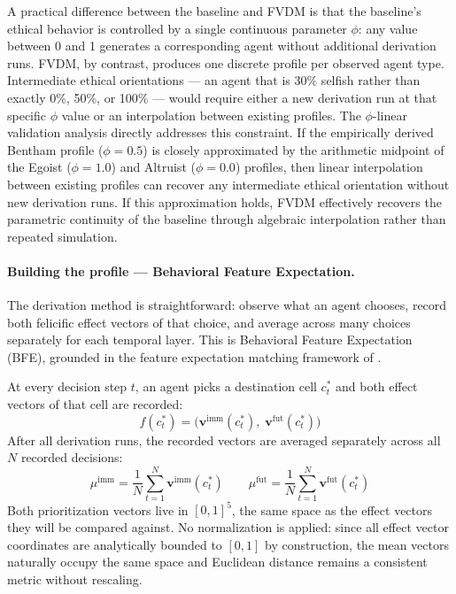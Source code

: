 \documentclass{icsthesis}
\begin{document}
\begin{mainmatter}
A practical difference between the baseline and FVDM is that the baseline’s ethical behavior is controlled by a single continuous parameter $\phi$: any value between 0 and 1 generates a corresponding agent without additional derivation runs. FVDM, by contrast, produces one discrete profile per observed agent type. Intermediate ethical orientations --- an agent that is 30\% selfish rather than exactly 0\%, 50\%, or 100\% --- would require either a new derivation run at that specific $\phi$ value or an interpolation between existing profiles. The $\phi$-linear validation analysis directly addresses this constraint. If the empirically derived Bentham profile ($\phi = 0.5$) is closely approximated by the arithmetic midpoint of the Egoist ($\phi = 1.0$) and Altruist ($\phi = 0.0$) profiles, then linear interpolation between existing profiles can recover any intermediate ethical orientation without new derivation runs. If this approximation holds, FVDM effectively recovers the parametric continuity of the baseline through algebraic interpolation rather than repeated simulation.

\paragraph{Building the profile --- Behavioral Feature Expectation.}
The derivation method is straightforward: observe what an agent chooses, record both felicific effect vectors of that choice, and average across many choices separately for each temporal layer. This is Behavioral Feature Expectation (BFE), grounded in the feature expectation matching framework of \citet{AbbeelNg2004}.

At every decision step $t$, an agent picks a destination cell $c_t^*$ and both effect vectors of that cell are recorded:
\[
f(c_t^*) = \bigl(\mathbf{v}^{\mathrm{imm}}(c_t^*),\; \mathbf{v}^{\mathrm{fut}}(c_t^*)\bigr)
\]
After all derivation runs, the recorded vectors are averaged separately across all $N$ recorded decisions:
\[
\mu^{\mathrm{imm}} = \frac{1}{N} \sum_{t=1}^{N} \mathbf{v}^{\mathrm{imm}}(c_t^*)
\qquad
\mu^{\mathrm{fut}} = \frac{1}{N} \sum_{t=1}^{N} \mathbf{v}^{\mathrm{fut}}(c_t^*)
\]
Both prioritization vectors live in $[0,1]^5$, the same space as the effect vectors they will be compared against. No normalization is applied: since all effect vector coordinates are analytically bounded to $[0,1]$ by construction, the mean vectors naturally occupy the same space and Euclidean distance remains a consistent metric without rescaling.


\end{mainmatter}
\end{document}
